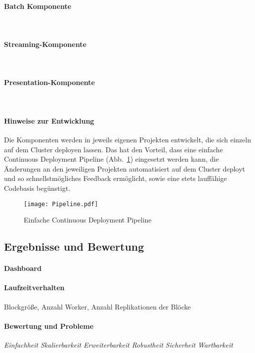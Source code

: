 \paragraph{Batch Komponente}\\

\paragraph{Streaming-Komponente}\\

\paragraph{Presentation-Komponente}\\

\paragraph{Hinweise zur Entwicklung}
Die Komponenten werden in jeweils eigenen Projekten entwickelt, die sich einzeln auf dem Cluster deployen lassen. Das hat den Vorteil, dass eine einfache Continuous Deployment Pipeline (Abb.~\ref{figure:cd_pipeline}) eingesetzt werden kann, die Änderungen an den jeweiligen Projekten automatisiert auf dem Cluster deployt und so schnellstmögliches Feedback ermöglicht, sowie eine stets lauffähige Codebasis begünstigt.\\

\begin{figure}[ht!]
	\centering
  \texttt{[image: Pipeline.pdf]}
	\caption{Einfache Continuous Deployment Pipeline}
	\label{figure:cd_pipeline}
\end{figure}

\subsection{Ergebnisse und Bewertung}
\paragraph{Dashboard}
\paragraph{Laufzeitverhalten}
Blockgröße, Anzahl Worker, Anzahl Replikationen der Blöcke
\paragraph{Bewertung und Probleme}

\textit{Einfachheit}
\textit{Skalierbarkeit}
\textit{Erweiterbarkeit}
\textit{Robustheit}
\textit{Sicherheit}
\textit{Wartbarkeit}
